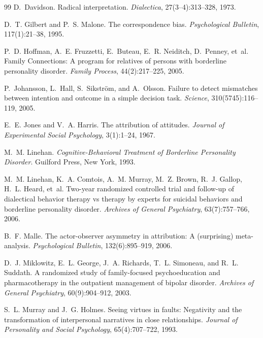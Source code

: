 \documentclass[11pt]{article}
\theoremstyle{definition}
\theoremstyle{remark}
\begin{document}
\begin{thebibliography}{99}
D.~Davidson.
\newblock Radical interpretation.
\newblock \emph{Dialectica}, 27(3--4):313--328, 1973.

D.~T. Gilbert and P.~S. Malone.
\newblock The correspondence bias.
\newblock \emph{Psychological Bulletin}, 117(1):21--38, 1995.

P.~D. Hoffman, A.~E. Fruzzetti, E.~Buteau, E.~R. Neiditch, D.~Penney, et~al.
\newblock Family Connections: A program for relatives of persons with borderline personality disorder.
\newblock \emph{Family Process}, 44(2):217--225, 2005.

P.~Johansson, L.~Hall, S.~Sikstr{\"o}m, and A.~Olsson.
\newblock Failure to detect mismatches between intention and outcome in a simple decision task.
\newblock \emph{Science}, 310(5745):116--119, 2005.

E.~E. Jones and V.~A. Harris.
\newblock The attribution of attitudes.
\newblock \emph{Journal of Experimental Social Psychology}, 3(1):1--24, 1967.

M.~M. Linehan.
\newblock \emph{Cognitive-Behavioral Treatment of Borderline Personality Disorder}.
\newblock Guilford Press, New York, 1993.

M.~M. Linehan, K.~A. Comtois, A.~M. Murray, M.~Z. Brown, R.~J. Gallop, H.~L. Heard, et~al.
\newblock Two-year randomized controlled trial and follow-up of dialectical behavior therapy vs therapy by experts for suicidal behaviors and borderline personality disorder.
\newblock \emph{Archives of General Psychiatry}, 63(7):757--766, 2006.

B.~F. Malle.
\newblock The actor-observer asymmetry in attribution: A (surprising) meta-analysis.
\newblock \emph{Psychological Bulletin}, 132(6):895--919, 2006.

D.~J. Miklowitz, E.~L. George, J.~A. Richards, T.~L. Simoneau, and R.~L. Suddath.
\newblock A randomized study of family-focused psychoeducation and pharmacotherapy in the outpatient management of bipolar disorder.
\newblock \emph{Archives of General Psychiatry}, 60(9):904--912, 2003.

S.~L. Murray and J.~G. Holmes.
\newblock Seeing virtues in faults: Negativity and the transformation of interpersonal narratives in close relationships.
\newblock \emph{Journal of Personality and Social Psychology}, 65(4):707--722, 1993.


\end{thebibliography}
\end{document}
